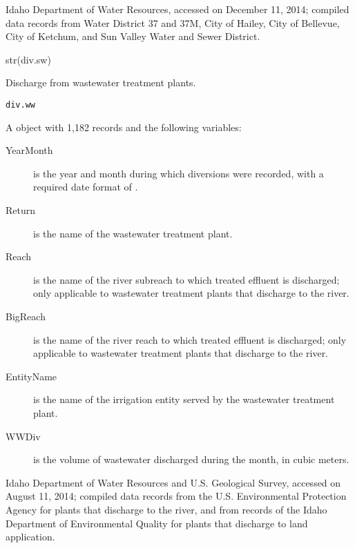 \documentclass[letterpaper]{book}
\begin{document}
%
\begin{Source}\relax
Idaho Department of Water Resources, accessed on December 11, 2014;
compiled data records from Water District 37 and 37M, City of Hailey, City of Bellevue, City of Ketchum, and Sun Valley Water and Sewer District.
\end{Source}
%
\begin{Examples}
\begin{ExampleCode}
str(div.sw)
\end{ExampleCode}
\end{Examples}
%
\begin{Description}\relax
Discharge from wastewater treatment plants.
\end{Description}
%
\begin{Usage}
\begin{verbatim}
div.ww
\end{verbatim}
\end{Usage}
%
\begin{Format}
A  object with 1,182 records and the following variables:
\begin{description}

\item[YearMonth] is the year and month during which diversions were recorded, with a required date format of .
\item[Return] is the name of the wastewater treatment plant.
\item[Reach] is the name of the river subreach to which treated effluent is discharged; only applicable to wastewater treatment plants that discharge to the river.
\item[BigReach] is the name of the river reach to which treated effluent is discharged; only applicable to wastewater treatment plants that discharge to the river.
\item[EntityName] is the name of the irrigation entity served by the wastewater treatment plant.
\item[WWDiv] is the volume of wastewater discharged during the month, in cubic meters.

\end{description}

\end{Format}
%
\begin{Source}\relax
Idaho Department of Water Resources and U.S. Geological Survey, accessed on August 11, 2014;
compiled data records from the U.S. Environmental Protection Agency for plants that discharge to the river, and from records of the Idaho Department of Environmental Quality for plants that discharge to land application.
\end{Source}
\end{document}
